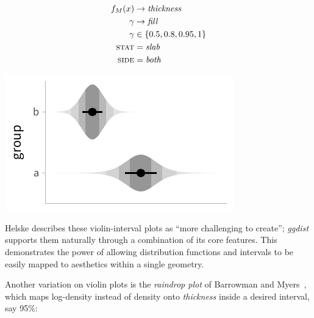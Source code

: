 \documentclass[journal]{vgtc}                     %
\begin{document}
 \noindent
\begin{minipage}{.5\columnwidth}

\begin{align*}
f_M(x) &\rightarrow \textit{thickness}\\
\gamma &\rightarrow \textit{fill}\\
\gamma &\in \{0.5, 0.8, 0.95, 1\}\\
\textsc{stat} &= \mathit{slab}\\
\textsc{side} &= \mathit{both}
\end{align*}
\end{minipage}%
  \begin{minipage}{.4\columnwidth}
    \centering
    \includegraphics[width=1.2\columnwidth]{figs/3-slab_violin_interval.pdf}
  \end{minipage}
\hfill\break

Helske describes these violin-interval plots as ``more challenging to create''; \textit{ggdist} supports them naturally through a combination of its core features. This demonstrates the power of allowing distribution functions and intervals to be easily mapped to aesthetics within a single geometry.

Another variation on violin plots is the \textit{raindrop plot} of Barrowman and Myers~\cite{barrowman2003raindrop}, which maps log-density instead of density onto \textit{thickness} inside a desired interval, say 95\%:
\end{document}
